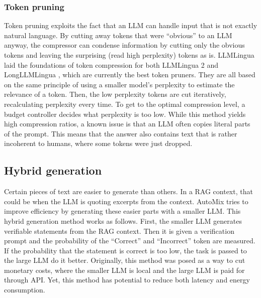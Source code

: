 \subsubsection{Token pruning}
Token pruning exploits the fact that an LLM can handle input that is not exactly natural language. By cutting away tokens that were ``obvious'' to an LLM anyway, the compressor can condense information by cutting only the obvious tokens and leaving the surprising (read high perplexity) tokens as is. LLMLingua \cite{jiang2023llmlingua} laid the foundations of token compression for both LLMLingua 2 \cite{pan2024llmlingua2} and LongLLMLingua \cite{jiang2023longllmlingua}, which are currently the best token pruners. They are all based on the same principle of using a smaller model's perplexity to estimate the relevance of a token. Then, the low perplexity tokens are cut iteratively, recalculating perplexity every time. To get to the optimal compression level, a budget controller decides what perplexity is too low. While this method yields high compression ratios, a known issue is that an LLM often copies literal parts of the prompt. This means that the answer also contains text that is rather incoherent to humans, where some tokens were just dropped.

\subsection{Hybrid generation}
Certain pieces of text are easier to generate than others. In a RAG context, that could be when the LLM is quoting excerpts from the context. AutoMix tries to improve efficiency by generating these easier parts with a smaller LLM. This hybrid generation method works as follows. First, the smaller LLM generates verifiable statements from the RAG context. Then it is given a verification prompt and the probability of the ``Correct'' and ``Incorrect'' token are measured. If the probability that the statement is correct is too low, the task is passed to the large LLM do it better. Originally, this method was posed as a way to cut monetary costs, where the smaller LLM is local and the large LLM is paid for through API. Yet, this method has potential to reduce both latency and energy consumption.

